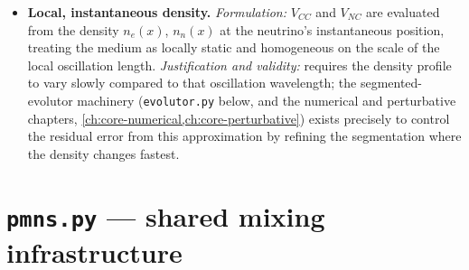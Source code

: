 \begin{notebox}
\begin{itemize}
    carry no coherent spin polarisation on the scales relevant here.
  \item \textbf{Local, instantaneous density.} \emph{Formulation:} $V_{CC}$
    and $V_{NC}$ are evaluated from the density $n_e(x)$, $n_n(x)$ at the
    neutrino's instantaneous position, treating the medium as locally
    static and homogeneous on the scale of the local oscillation length.
    \emph{Justification and validity:} requires the density profile to vary
    slowly compared to that oscillation wavelength; the segmented-evolutor
    machinery (\texttt{evolutor.py} below, and the numerical and
    perturbative chapters, \cref{ch:core-numerical,ch:core-perturbative})
    exists precisely to control the residual error from this approximation
    by refining the segmentation where the density changes fastest.
\end{itemize}
\end{notebox}

\section{\texttt{pmns.py} --- shared mixing infrastructure}


